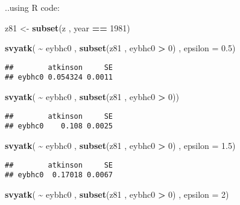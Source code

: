\documentclass[
]{book}
\newenvironment{Shaded}{\begin{snugshade}}{\end{snugshade}}
\newcommand{\AttributeTok}[1]{\textcolor[rgb]{0.13,0.29,0.53}{#1}}
\newcommand{\DecValTok}[1]{\textcolor[rgb]{0.00,0.00,0.81}{#1}}
\newcommand{\FloatTok}[1]{\textcolor[rgb]{0.00,0.00,0.81}{#1}}
\newcommand{\FunctionTok}[1]{\textcolor[rgb]{0.13,0.29,0.53}{\textbf{#1}}}
\newcommand{\NormalTok}[1]{#1}
\newcommand{\OtherTok}[1]{\textcolor[rgb]{0.56,0.35,0.01}{#1}}
\newcommand{\SpecialCharTok}[1]{\textcolor[rgb]{0.81,0.36,0.00}{\textbf{#1}}}
\begin{document}
..using R code:

\begin{Shaded}
\begin{Highlighting}[]
\NormalTok{z81 }\OtherTok{\textless{}{-}} \FunctionTok{subset}\NormalTok{(z , year }\SpecialCharTok{==} \DecValTok{1981}\NormalTok{)}

\FunctionTok{svyatk}\NormalTok{( }\SpecialCharTok{\textasciitilde{}}\NormalTok{ eybhc0 , }\FunctionTok{subset}\NormalTok{(z81 , eybhc0 }\SpecialCharTok{\textgreater{}} \DecValTok{0}\NormalTok{) , }\AttributeTok{epsilon =} \FloatTok{0.5}\NormalTok{)}
\end{Highlighting}
\end{Shaded}

\begin{verbatim}
##        atkinson     SE
## eybhc0 0.054324 0.0011
\end{verbatim}

\begin{Shaded}
\begin{Highlighting}[]
\FunctionTok{svyatk}\NormalTok{( }\SpecialCharTok{\textasciitilde{}}\NormalTok{ eybhc0 , }\FunctionTok{subset}\NormalTok{(z81 , eybhc0 }\SpecialCharTok{\textgreater{}} \DecValTok{0}\NormalTok{))}
\end{Highlighting}
\end{Shaded}

\begin{verbatim}
##        atkinson     SE
## eybhc0    0.108 0.0025
\end{verbatim}

\begin{Shaded}
\begin{Highlighting}[]
\FunctionTok{svyatk}\NormalTok{( }\SpecialCharTok{\textasciitilde{}}\NormalTok{ eybhc0 , }\FunctionTok{subset}\NormalTok{(z81 , eybhc0 }\SpecialCharTok{\textgreater{}} \DecValTok{0}\NormalTok{) , }\AttributeTok{epsilon =} \FloatTok{1.5}\NormalTok{)}
\end{Highlighting}
\end{Shaded}

\begin{verbatim}
##        atkinson     SE
## eybhc0  0.17018 0.0067
\end{verbatim}

\begin{Shaded}
\begin{Highlighting}[]
\FunctionTok{svyatk}\NormalTok{( }\SpecialCharTok{\textasciitilde{}}\NormalTok{ eybhc0 , }\FunctionTok{subset}\NormalTok{(z81 , eybhc0 }\SpecialCharTok{\textgreater{}} \DecValTok{0}\NormalTok{) , }\AttributeTok{epsilon =} \DecValTok{2}\NormalTok{)}
\end{Highlighting}
\end{Shaded}
\end{document}
